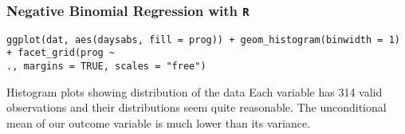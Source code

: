 \documentclass[00-GLMregslides.tex]{subfiles}
\begin{document}
\begin{frame}[fragile]
	\frametitle{Negative Binomial Regression with \texttt{R} }
	\Large

\begin{verbatim}	
ggplot(dat, aes(daysabs, fill = prog)) + geom_histogram(binwidth = 1) + facet_grid(prog ~ 
., margins = TRUE, scales = "free")
\end{verbatim}
Histogram plots showing distribution of the data
Each variable has 314 valid observations and their distributions seem quite reasonable. The unconditional mean of our outcome variable is much lower than its variance.
\end{frame}
\end{document}
